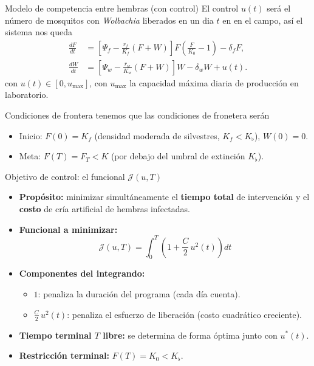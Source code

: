 \documentclass[10pt, aspectratio=169]{beamer}
\newcommand{\tb}{\textbf}
\newcommand{\ti}{\textit}
\begin{document}
\begin{frame}{Modelo de competencia entre hembras (con control)}
    El control $u(t)$ será el número de mosquitos con \ti{Wolbachia} liberados en un dia $t$ en 
    en el campo, así el sistema nos queda
    \begin{align*}
                \frac{dF}{dt} &= \left[\Psi_f - \frac{r_f}{K_f}(F+W)\right] F 
                         \left(\frac{F}{K_0} - 1\right) - \delta_f F,\\
        \frac{dW}{dt} &= \left[\Psi_w - \frac{r_w}{K_w}(F+W)\right] W 
                         - \delta_w W + u(t).
    \end{align*}
    con $u(t) \in [0, u_{\max}]$, con $u_{\max}$ la capacidad máxima 
              diaria de producción en laboratorio.
\end{frame}
\begin{frame}{Condiciones de frontera}
    tenemos que las condiciones de fronetera serán
    \begin{itemize}
        \item Inicio: $F(0) = K_f$ (densidad moderada de silvestres, 
              $K_f < K_{\flat}$), \; $W(0) = 0$.
        \item Meta: $F(T) = F_T < K$ (por debajo del umbral de extinción 
              $K_{\flat}$).
    \end{itemize}
\end{frame}
\begin{frame}{Objetivo de control: el funcional $\mathcal{J}(u,T)$}
\begin{itemize}
    \item \textbf{Propósito:} minimizar simultáneamente el \tb{tiempo total} 
          de intervención y el \tb{costo} de cría artificial de hembras 
          infectadas.
    \item \textbf{Funcional a minimizar:}
          \[
          \mathcal{J}(u,T) = \int_{0}^{T} \left(1 + \frac{C}{2}\, u^2(t)\right) dt
          \]
    \item \textbf{Componentes del integrando:}
          \begin{itemize}
              \item $1$: penaliza la duración del programa (cada día cuenta).
              \item $\displaystyle \frac{C}{2}\,u^2(t)$: penaliza el esfuerzo 
                    de liberación (costo cuadrático creciente).
          \end{itemize}
    \item \textbf{Tiempo terminal $T$ libre:} se determina de forma óptima 
          junto con $u^*(t)$.
    \item \textbf{Restricción terminal:} $F(T) = K_0 < K_{\flat}$.
\end{itemize}
\end{frame}
\end{document}
